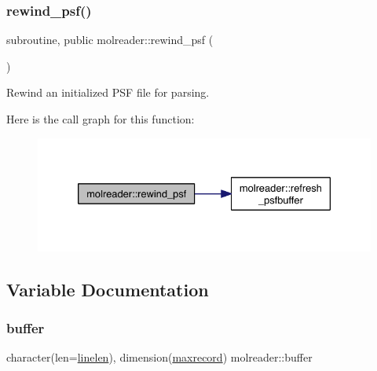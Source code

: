 \subsubsection{\texorpdfstring{rewind\+\_\+psf()}{rewind\_psf()}}
{\footnotesize\ttfamily subroutine, public molreader\+::rewind\+\_\+psf (\begin{DoxyParamCaption}{ }\end{DoxyParamCaption})}



Rewind an initialized P\+SF file for parsing. 

Here is the call graph for this function\+:\nopagebreak
\begin{figure}[H]
\begin{center}
\leavevmode
\includegraphics[width=330pt]{namespacemolreader_a6d79c8d97fd91cfb25dec2b67320c77b_cgraph}
\end{center}
\end{figure}


\subsection{Variable Documentation}
\mbox{\label{namespacemolreader_a06d78b69405420664607fb01b4d8e97a}} 
\subsubsection{\texorpdfstring{buffer}{buffer}}
{\footnotesize\ttfamily character(len=\hyperlink{namespacemolreader_acd493d996a1fcd0ed77937e925c9b7fe}{linelen}), dimension(\hyperlink{namespacemolreader_a7192fdfba4bcb0ee7504a9c6695c7106}{maxrecord}) molreader\+::buffer\hspace{0.3cm}{\ttfamily [private]}}

\mbox{\label{namespacemolreader_ac7969154d301aab4a51cde89ec2f08ee}} 
